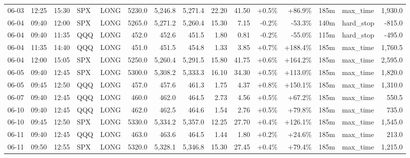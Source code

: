 \documentclass[11pt,a4paper,twoside]{article}
\begin{document}
\begin{landscape}
\begin{center}
\begin{longtable}{>{\color{txtmain}}l l l l l r r r r r r r r >{\color{txtmain}}l r}
06-03 & 12:25 & 15:30 & SPX & LONG & 5230.0 & 5,246.8 & 5,271.4 & 22.20 & 41.50 & \textcolor{wingreen}{+0.5\%} & \textcolor{wingreen}{+86.9\%} & 185m & max\_time & \textcolor{wingreen}{1,930.0} \\
06-04 & 09:40 & 12:00 & SPX & LONG & 5265.0 & 5,271.2 & 5,260.4 & 15.30 & 7.15 & \textcolor{lossred}{-0.2\%} & \textcolor{lossred}{-53.3\%} & 140m & hard\_stop & \textcolor{lossred}{-815.0} \\
06-04 & 09:40 & 11:35 & QQQ & LONG & 452.0 & 452.6 & 451.5 & 1.80 & 0.81 & \textcolor{lossred}{-0.2\%} & \textcolor{lossred}{-55.0\%} & 115m & hard\_stop & \textcolor{lossred}{-495.0} \\
06-04 & 11:35 & 14:40 & QQQ & LONG & 451.0 & 451.5 & 454.8 & 1.33 & 3.85 & \textcolor{wingreen}{+0.7\%} & \textcolor{wingreen}{+188.4\%} & 185m & max\_time & \textcolor{wingreen}{1,760.5} \\
06-04 & 12:00 & 15:05 & SPX & LONG & 5250.0 & 5,260.4 & 5,291.5 & 15.80 & 41.75 & \textcolor{wingreen}{+0.6\%} & \textcolor{wingreen}{+164.2\%} & 185m & max\_time & \textcolor{wingreen}{2,595.0} \\
06-05 & 09:40 & 12:45 & SPX & LONG & 5300.0 & 5,308.2 & 5,333.3 & 16.10 & 34.30 & \textcolor{wingreen}{+0.5\%} & \textcolor{wingreen}{+113.0\%} & 185m & max\_time & \textcolor{wingreen}{1,820.0} \\
06-05 & 09:45 & 12:50 & QQQ & LONG & 457.0 & 457.6 & 461.3 & 1.75 & 4.37 & \textcolor{wingreen}{+0.8\%} & \textcolor{wingreen}{+150.1\%} & 185m & max\_time & \textcolor{wingreen}{1,310.0} \\
06-07 & 09:40 & 12:45 & QQQ & LONG & 460.0 & 462.0 & 464.5 & 2.73 & 4.56 & \textcolor{wingreen}{+0.5\%} & \textcolor{wingreen}{+67.2\%} & 185m & max\_time & \textcolor{wingreen}{550.5} \\
06-10 & 09:40 & 12:45 & QQQ & LONG & 462.0 & 462.5 & 464.6 & 1.54 & 2.76 & \textcolor{wingreen}{+0.5\%} & \textcolor{wingreen}{+79.8\%} & 185m & max\_time & \textcolor{wingreen}{735.0} \\
06-10 & 09:45 & 12:50 & SPX & LONG & 5330.0 & 5,334.2 & 5,357.0 & 12.25 & 27.70 & \textcolor{wingreen}{+0.4\%} & \textcolor{wingreen}{+126.1\%} & 185m & max\_time & \textcolor{wingreen}{1,545.0} \\
06-11 & 09:40 & 12:45 & QQQ & LONG & 463.0 & 463.6 & 464.5 & 1.44 & 1.80 & \textcolor{wingreen}{+0.2\%} & \textcolor{wingreen}{+24.6\%} & 185m & max\_time & \textcolor{wingreen}{213.0} \\
06-11 & 09:50 & 12:55 & SPX & LONG & 5320.0 & 5,328.1 & 5,346.8 & 15.30 & 27.45 & \textcolor{wingreen}{+0.4\%} & \textcolor{wingreen}{+79.4\%} & 185m & max\_time & \textcolor{wingreen}{1,215.0} \\

\end{longtable}
\end{center}
\end{landscape}
\end{document}
